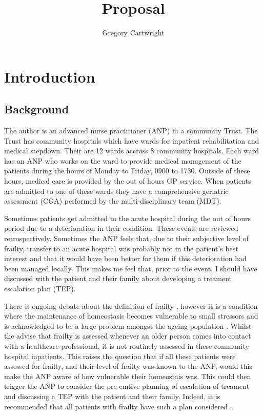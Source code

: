 \documentclass[12pt,a4paper,oneside,titlepage]{article}
\begin{document}
\author{Gregory Cartwright}
\title{Proposal}
\section*{Introduction}

\subsection*{Background}
The author is an advanced nurse practitioner (ANP) in a community Trust.
The Trust has community hospitals which have wards for inpatient rehabilitation and
medical stepdown. Their are 12 wards accross 8 community hospitals. Each ward has
an ANP who works on the ward to provide medical management of the patients during 
the hours of Monday to Friday, 0900 to 1730. Outside of these hours, medical care 
is provided by the out of hours GP service. When patients are admitted to one of
these wards they have a comprehensive geriatric assessment (CGA) \parencite{bgs:14} 
performed by the multi-disciplinary team (MDT).

Sometimes patients get admitted to the acute hospital during the out of hours period due to a 
deterioration in their condition.
These events are reviewed retrospectively. Sometimes the ANP feels that, 
due to their subjective level of frailty, transfer 
to an acute hospital was probably not in the patient's best interest and that it
would have been better for them if this deterioration had been managed locally.
This makes me feel that, prior to the event, I should have discussed with the patient and
their family about developing a treament escalation plan (TEP).

There is ongoing debate about the definition of frailty 
\parencite{shamliyan:13}, however it is a condition where the maintenance of homeostasis becomes vulnerable to 
small stressors and is acknowledged to be a large problem amongst the ageing population 
\parencite{clegg:13}.
Whilst the \textcite{bgs:14} advise that frailty is assessed whenever an older person
comes into contact with a healthcare professional, it is not routinely assessed 
in these community hospital inpatients. This raises the question that if all these 
patients were assessed for frailty, and their level of frailty was known to the ANP,
would this make the ANP aware of how vulnerable their homeostais was.
This could then trigger the ANP to consider the pre-emtive planning of escalation
of treament and discussing a TEP with the patient and their family. Indeed,
it is recommended that all patients with frailty have such a plan considered
\parencite{bgs:14}.
\end{document}
